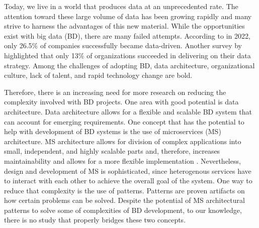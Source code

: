 \documentclass[a4paper,11pt,article,oneside]{memoir}
\begin{document}
Today, we live in a world that produces data at an unprecedented rate. The attention toward these large volume of data has been growing rapidly and many strive to harness the advantages of this new material. While the opportunities exist with big data (BD), there are many failed attempts. According to \citet{NewVantageSurvey} in 2022, only 26.5\% of companies successfully became data-driven. Another survey by \citet{DataBricksSurvey} highlighted that only 13\% of organizations succeeded in delivering on their data strategy. Among the challenges of adopting BD, data architecture, organizational culture, lack of talent, and rapid technology change are bold. 

Therefore, there is an increasing need for more research on reducing the complexity involved with BD projects. One area with good potential is data architecture. Data architecture allows for a flexible and scalable BD system that can account for emerging requirements. One concept that has the potential to help with development of BD systems is the use of microservices (MS) architecture. MS architecture allows for division of complex applications into small, independent, and highly scalable parts and, therefore, increases maintainability and allows for a more flexible implementation \citep[p.~20]{Richardson.2022}. Nevertheless, design and development of MS is sophisticated, since heterogenous services have to interact with each other to achieve the overall goal of the system. One way to reduce that complexity is the use of patterns. Patterns are proven artifacts on how certain problems can be solved. Despite the potential of MS architectural patterns to solve some of complexities of BD development, to our knowledge, there is no study that properly bridges these two concepts. 






% 




\end{document}
